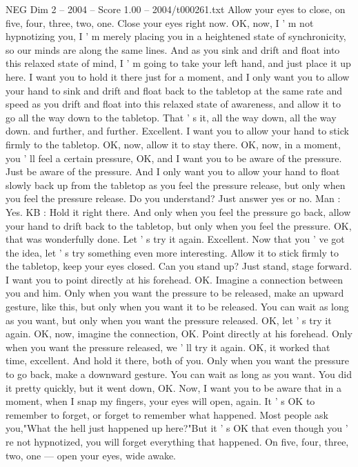 \begin{textsample}{NEG Dim 2 – 2004 – Score 1.00 – 2004/t000261.txt}
Allow your eyes to close, on five, four, three, two, one.
Close your eyes right now.
OK, now, I ' m not hypnotizing you, I ' m merely placing you in a heightened state of synchronicity, so our minds are along the same lines.
And as you sink and drift and float into this relaxed state of mind, I ' m going to take your left hand, and just place it up here.
I want you to hold it there just for a moment, and I only want you to allow your hand to sink and drift and float back to the tabletop at the same rate and speed as you drift and float into this relaxed state of awareness, and allow it to go all the way down to the tabletop.
That ' s it, all the way down, all the way down. and further, and further.
Excellent.
I want you to allow your hand to stick firmly to the tabletop.
OK, now, allow it to stay there.
OK, now, in a moment, you ' ll feel a certain pressure, OK, and I want you to be aware of the pressure.
Just be aware of the pressure.
And I only want you to allow your hand to float slowly back up from the tabletop as you feel the pressure release, but only when you feel the pressure release.
Do you understand?
Just answer yes or no.
Man : Yes.
KB : Hold it right there.
And only when you feel the pressure go back, allow your hand to drift back to the tabletop, but only when you feel the pressure.
OK, that was wonderfully done.
Let ' s try it again.
Excellent.
Now that you ' ve got the idea, let ' s try something even more interesting.
Allow it to stick firmly to the tabletop, keep your eyes closed.
Can you stand up?
Just stand, stage forward.
I want you to point directly at his forehead.
OK.
Imagine a connection between you and him.
Only when you want the pressure to be released, make an upward gesture, like this, but only when you want it to be released.
You can wait as long as you want, but only when you want the pressure released.
OK, let ' s try it again.
OK, now, imagine the connection, OK.
Point directly at his forehead.
Only when you want the pressure released, we ' ll try it again.
OK, it worked that time, excellent.
And hold it there, both of you.
Only when you want the pressure to go back, make a downward gesture.
You can wait as long as you want.
You did it pretty quickly, but it went down, OK.
Now, I want you to be aware that in a moment, when I snap my fingers, your eyes will open, again.
It ' s OK to remember to forget, or forget to remember what happened.
Most people ask you,"What the hell just happened up here?"But it ' s OK that even though you ' re not hypnotized, you will forget everything that happened.
On five, four, three, two, one — open your eyes, wide awake.

\end{textsample}
